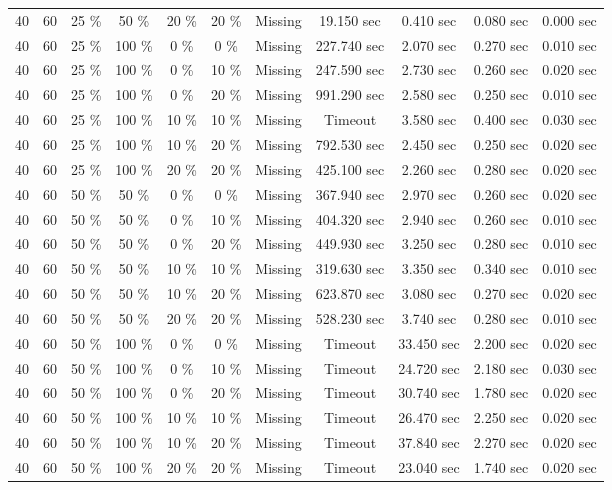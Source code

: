 \documentclass{article}
\begin{document}
\begin{longtable}[]{@{}ccccccccccc@{}}
40 & 60 & 25 \% & 50 \% & 20 \% & 20 \% & Missing & 19.150 sec & 0.410 sec & 0.080 sec & 0.000 sec \\
40 & 60 & 25 \% & 100 \% & 0 \% & 0 \% & Missing & 227.740 sec & 2.070 sec & 0.270 sec & 0.010 sec \\
40 & 60 & 25 \% & 100 \% & 0 \% & 10 \% & Missing & 247.590 sec & 2.730 sec & 0.260 sec & 0.020 sec \\
40 & 60 & 25 \% & 100 \% & 0 \% & 20 \% & Missing & 991.290 sec & 2.580 sec & 0.250 sec & 0.010 sec \\
40 & 60 & 25 \% & 100 \% & 10 \% & 10 \% & Missing & Timeout & 3.580 sec & 0.400 sec & 0.030 sec \\
40 & 60 & 25 \% & 100 \% & 10 \% & 20 \% & Missing & 792.530 sec & 2.450 sec & 0.250 sec & 0.020 sec \\
40 & 60 & 25 \% & 100 \% & 20 \% & 20 \% & Missing & 425.100 sec & 2.260 sec & 0.280 sec & 0.020 sec \\
40 & 60 & 50 \% & 50 \% & 0 \% & 0 \% & Missing & 367.940 sec & 2.970 sec & 0.260 sec & 0.020 sec \\
40 & 60 & 50 \% & 50 \% & 0 \% & 10 \% & Missing & 404.320 sec & 2.940 sec & 0.260 sec & 0.010 sec \\
40 & 60 & 50 \% & 50 \% & 0 \% & 20 \% & Missing & 449.930 sec & 3.250 sec & 0.280 sec & 0.010 sec \\
40 & 60 & 50 \% & 50 \% & 10 \% & 10 \% & Missing & 319.630 sec & 3.350 sec & 0.340 sec & 0.010 sec \\
40 & 60 & 50 \% & 50 \% & 10 \% & 20 \% & Missing & 623.870 sec & 3.080 sec & 0.270 sec & 0.020 sec \\
40 & 60 & 50 \% & 50 \% & 20 \% & 20 \% & Missing & 528.230 sec & 3.740 sec & 0.280 sec & 0.010 sec \\
40 & 60 & 50 \% & 100 \% & 0 \% & 0 \% & Missing & Timeout & 33.450 sec & 2.200 sec & 0.020 sec \\
40 & 60 & 50 \% & 100 \% & 0 \% & 10 \% & Missing & Timeout & 24.720 sec & 2.180 sec & 0.030 sec \\
40 & 60 & 50 \% & 100 \% & 0 \% & 20 \% & Missing & Timeout & 30.740 sec & 1.780 sec & 0.020 sec \\
40 & 60 & 50 \% & 100 \% & 10 \% & 10 \% & Missing & Timeout & 26.470 sec & 2.250 sec & 0.020 sec \\
40 & 60 & 50 \% & 100 \% & 10 \% & 20 \% & Missing & Timeout & 37.840 sec & 2.270 sec & 0.020 sec \\
40 & 60 & 50 \% & 100 \% & 20 \% & 20 \% & Missing & Timeout & 23.040 sec & 1.740 sec & 0.020 sec \\

\end{longtable}
\end{document}
